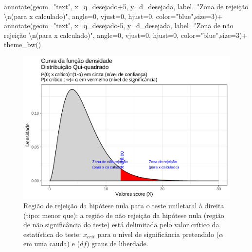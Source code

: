 \documentclass[
]{book}
\newenvironment{Shaded}{\begin{snugshade}}{\end{snugshade}}
\newcommand{\AttributeTok}[1]{\textcolor[rgb]{0.77,0.63,0.00}{#1}}
\newcommand{\DecValTok}[1]{\textcolor[rgb]{0.00,0.00,0.81}{#1}}
\newcommand{\FunctionTok}[1]{\textcolor[rgb]{0.00,0.00,0.00}{#1}}
\newcommand{\NormalTok}[1]{#1}
\newcommand{\SpecialCharTok}[1]{\textcolor[rgb]{0.00,0.00,0.00}{#1}}
\newcommand{\StringTok}[1]{\textcolor[rgb]{0.31,0.60,0.02}{#1}}
\begin{document}
\begin{Shaded}
\begin{Highlighting}[]
 \FunctionTok{annotate}\NormalTok{(}\AttributeTok{geom=}\StringTok{"text"}\NormalTok{, }\AttributeTok{x=}\NormalTok{q\_desejado}\SpecialCharTok{+}\DecValTok{5}\NormalTok{, }\AttributeTok{y=}\NormalTok{d\_desejada, }\AttributeTok{label=}\StringTok{"Zona de rejeição }\SpecialCharTok{\textbackslash{}n}\StringTok{(para x calculado)"}\NormalTok{, }\AttributeTok{angle=}\DecValTok{0}\NormalTok{, }\AttributeTok{vjust=}\DecValTok{0}\NormalTok{, }\AttributeTok{hjust=}\DecValTok{0}\NormalTok{, }\AttributeTok{color=}\StringTok{"blue"}\NormalTok{,}\AttributeTok{size=}\DecValTok{3}\NormalTok{)}\SpecialCharTok{+}
  \FunctionTok{annotate}\NormalTok{(}\AttributeTok{geom=}\StringTok{"text"}\NormalTok{, }\AttributeTok{x=}\NormalTok{q\_desejado}\DecValTok{{-}5}\NormalTok{, }\AttributeTok{y=}\NormalTok{d\_desejada, }\AttributeTok{label=}\StringTok{"Zona de não rejeição  }\SpecialCharTok{\textbackslash{}n}\StringTok{(para x calculado)"}\NormalTok{, }\AttributeTok{angle=}\DecValTok{0}\NormalTok{, }\AttributeTok{vjust=}\DecValTok{0}\NormalTok{, }\AttributeTok{hjust=}\DecValTok{0}\NormalTok{, }\AttributeTok{color=}\StringTok{"blue"}\NormalTok{,}\AttributeTok{size=}\DecValTok{3}\NormalTok{)}\SpecialCharTok{+}
  \FunctionTok{theme\_bw}\NormalTok{()}
\end{Highlighting}
\end{Shaded}

\begin{figure}

{\centering \includegraphics[width=1\linewidth]{apostila_files/figure-latex/fig95-1} 

}

\caption{Região de rejeição da hipótese nula para o teste uniletaral à direita (tipo: menor que): a região de não rejeição da hipótese nula (região de não significância do teste) está delimitada pelo valor crítico da estatística do teste: $x_{crit}$ para o nível de significância pretendido ($\alpha$ em uma cauda) e ($df$) graus de liberdade.}\label{fig:fig95}
\end{figure}
\end{document}
